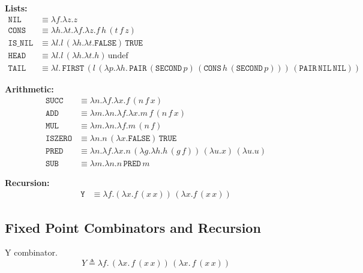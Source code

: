 \documentclass[12pt]{book}
\theoremstyle{plain}
\theoremstyle{definition}
\theoremstyle{definition}
\theoremstyle{definition}
\begin{document}
\textbf{Lists:}
\begin{align*}
\texttt{NIL} &\equiv \lambda f.\lambda z. z \\
\texttt{CONS} &\equiv \lambda h.\lambda t.\lambda f.\lambda z. f\,h\,(t\,f\,z) \\
\texttt{IS\_NIL} &\equiv \lambda l. l\,(\lambda h.\lambda t. \texttt{FALSE})\,\texttt{TRUE} \\
\texttt{HEAD} &\equiv \lambda l. l\,(\lambda h.\lambda t. h)\,\text{undef} \\
\texttt{TAIL} &\equiv \lambda l.\, \texttt{FIRST}\,(l\,(\lambda p.\lambda h.\, \texttt{PAIR}\,(\texttt{SECOND}\,p)\,(\texttt{CONS}\,h\,(\texttt{SECOND}\,p)))\,(\texttt{PAIR}\,\texttt{NIL}\,\texttt{NIL}))
\end{align*}

\textbf{Arithmetic:}
\begin{align*}
\texttt{SUCC} &\equiv \lambda n.\lambda f.\lambda x. f\,(n\,f\,x) \\
\texttt{ADD} &\equiv \lambda m.\lambda n.\lambda f.\lambda x. m\,f\,(n\,f\,x) \\
\texttt{MUL} &\equiv \lambda m.\lambda n.\lambda f. m\,(n\,f) \\
\texttt{ISZERO} &\equiv \lambda n. n\,(\lambda x.\texttt{FALSE})\,\texttt{TRUE} \\
\texttt{PRED} &\equiv \lambda n.\lambda f.\lambda x. n\,(\lambda g.\lambda h. h\,(g\,f))\,(\lambda u. x)\,(\lambda u. u) \\
\texttt{SUB} &\equiv \lambda m.\lambda n. n\,\texttt{PRED}\,m
\end{align*}

\textbf{Recursion:}
\begin{align*}
\texttt{Y} &\equiv \lambda f.(\lambda x. f\,(x\,x))\,(\lambda x. f\,(x\,x))
\end{align*}



















\subsection{\centering Fixed Point Combinators and Recursion}

Y combinator.
\[
Y \triangleq \lambda f.\, (\lambda x.\, f\, (x\, x))\, (\lambda x.\, f\, (x\, x))
\]
\end{document}
